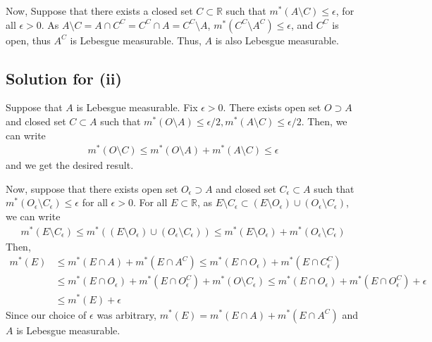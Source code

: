 \documentclass{scrartcl}
\begin{document}
Now, Suppose that there exists a closed set \(C \subset \mathbb{R}\) such that
\(m^*(A \setminus C) \le \epsilon\), for all \(\epsilon > 0\). As \(A \setminus
C = A \cap C^C = C^C \cap A = C^C \setminus A\), \(m^*(C^C \setminus A^C) \le
\epsilon\), and \(C^C\) is open, thus \(A^C\) is Lebesgue measurable. Thus,
\(A\) is also Lebesgue measurable.

\subsection{Solution for (ii)}
Suppose that \(A\) is Lebesgue measurable. Fix \(\epsilon > 0\). There exists
open set \(O \supset A\) and closed set \(C \subset A\) such that \(m^*(O
\setminus A) \le \epsilon / 2, m^*(A \setminus C) \le \epsilon / 2\). Then, we
can write
\begin{align*}
  m^*(O \setminus C)
  \le m^*(O \setminus A) + m^*(A \setminus C)
  \le \epsilon
\end{align*}
and we get the desired result.

Now, suppose that there exists open set \(O_\epsilon \supset A\) and closed set
\(C_\epsilon \subset A\) such that \(m^*(O_\epsilon \setminus C_\epsilon) \le
\epsilon\) for all \(\epsilon > 0\). For all \(E \subset \mathbb{R}\), as \(E
\setminus C_\epsilon \subset (E \setminus O_\epsilon) \cup (O_\epsilon
\setminus C_\epsilon)\), we can write
\begin{align*}
  m^*(E \setminus C_\epsilon)
  \le m^*((E \setminus O_\epsilon) \cup (O_\epsilon \setminus C_\epsilon))
  \le m^*(E \setminus O_\epsilon) + m^*(O_\epsilon \setminus C_\epsilon)
\end{align*}
Then,
\begin{align*}
  m^*(E)
  &\le m^*(E \cap A) + m^*(E \cap A^C)
  \le m^*(E \cap O_\epsilon) + m^*(E \cap C^C_\epsilon) \\
  &\le m^*(E \cap O_\epsilon) + m^*(E \cap O^C_\epsilon)
    + m^*(O \setminus C_\epsilon)
  \le m^*(E \cap O_\epsilon) + m^*(E \cap O^C_\epsilon) + \epsilon \\
  &\le m^*(E) + \epsilon
\end{align*}
Since our choice of \(\epsilon\) was arbitrary, \(m^*(E) = m^*(E \cap A) +
m^*(E \cap A^C)\) and \(A\) is Lebesgue measurable.
\end{document}
